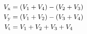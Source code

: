 \begin{subequations}
\begin{align}
  V_{\mathrm{x}} & = \left( V_{\mathrm{1}}+V_{\mathrm{4}} \right) - \left( V_{\mathrm{2}} + 
  V_{\mathrm{3}}  \right) \\
  V_{\mathrm{y}} & = \left( V_{\mathrm{1}}+V_{\mathrm{2}} \right) - \left( V_{\mathrm{3}} + 
  V_{\mathrm{4}}  \right) \\
  V_{\mathrm{t}} & = V_{\mathrm{1}}+V_{\mathrm{2}} + V_{\mathrm{3}} + V_{\mathrm{4}}
\end{align}
\end{subequations}


